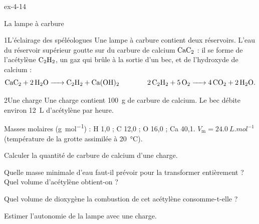 \begin{blocLivre}{ex-4-14}
\begin{exercice}[3]{La lampe à carbure}
\begin{docu}{1}{L'éclairage des spéléologues}
Une lampe à carbure contient deux réservoirs. L'eau du réservoir supérieur goutte sur du carbure de calcium $\ce{CaC2}$ : il
se forme de l'acétylène $\ce{C2H2}$, un gaz qui brûle à la sortie d'un bec, et de l'hydroxyde de calcium :
\[\ce{CaC2 + 2H2O -> C2H2 + Ca(OH)2}\qquad\qquad\ce{2C2H2 + 5O2 -> 4CO2 + 2H2O}.\]
\end{docu}
\begin{docu}{2}{Une charge}
Une charge contient \qty{100}{g} de carbure de calcium. Le bec débite environ \qty{12}{L} d'acétylène par heure.
\end{docu}
\begin{donnees}
Masses molaires (\unit{g.mol^{-1}}) : H 1,0 ; C 12,0 ; O 16,0 ; Ca 40,1. $V_\mathrm{m}=\qty{24,0}{L.mol^{-1}}$ (température de la grotte assimilée à \qty{20}{\degreeCelsius}).
\end{donnees}
\begin{questions}
\item Calculer la quantité de carbure de calcium d'une charge.
\item Quelle masse minimale d'eau faut-il prévoir pour la transformer entièrement ? Quel volume d'acétylène obtient-on ?
\item Quel volume de dioxygène la combustion de cet acétylène consomme-t-elle ?
\item \initiative Estimer l'autonomie de la lampe avec une charge.
\end{questions}
\end{exercice}
\end{blocLivre}
